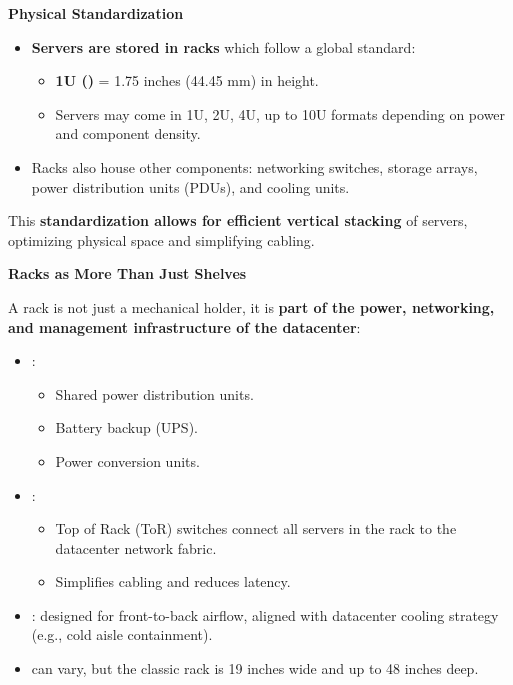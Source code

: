 \highspace
\begin{flushleft}
    \textcolor{Green3}{ \textbf{Physical Standardization}}
\end{flushleft}
\begin{itemize}
    \item \textbf{Servers are stored in racks} which follow a global standard:
    \begin{itemize}
        \item \textbf{1U ()} = 1.75 inches (44.45 mm) in height.
        \item Servers may come in 1U, 2U, 4U, up to 10U formats depending on power and component density.
    \end{itemize}

    \item Racks also house other components: networking switches, storage arrays, power distribution units (PDUs), and cooling units.
\end{itemize}
This \textbf{standardization allows for efficient vertical stacking} of servers, optimizing physical space and simplifying cabling.

\highspace
\begin{flushleft}
    \textcolor{Green3}{ \textbf{Racks as More Than Just Shelves}}
\end{flushleft}
A rack is not just a mechanical holder, it is \textbf{part of the power, networking, and management infrastructure of the datacenter}:
\begin{itemize}
    \item {}:
    \begin{itemize}
        \item Shared power distribution units.
        \item Battery backup (UPS).
        \item Power conversion units.
    \end{itemize}
    
    \item {}:
    \begin{itemize}
        \item Top of Rack (ToR) switches connect all servers in the rack to the datacenter network fabric.
        \item Simplifies cabling and reduces latency.
    \end{itemize}
  
    \item {}: designed for front-to-back airflow, aligned with datacenter cooling strategy (e.g., cold aisle containment).
  
    \item {} can vary, but the classic rack is 19 inches wide and up to 48 inches deep.
\end{itemize}


